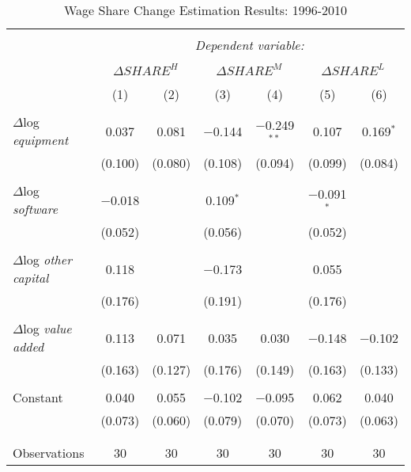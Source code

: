 \documentclass{article}
\begin{document}
\begin{sidewaystable}[!htbp] \centering 
  \caption{Wage Share Change Estimation Results: 1996-2010} 
  \label{tbl:reg} 
\begin{tabular}{@{\extracolsep{5pt}}lcccccc} 
\\[-1.8ex]\hline 
\hline \\[-1.8ex] 
 & \multicolumn{6}{c}{\textit{Dependent variable:}} \\ 
\cline{2-7} 
\\[-1.8ex] & \multicolumn{2}{c}{$\Delta SHARE^H$} & \multicolumn{2}{c}{$\Delta SHARE^M$} & \multicolumn{2}{c}{$\Delta SHARE^L$} \\ 
\\[-1.8ex] & (1) & (2) & (3) & (4) & (5) & (6)\\ 
\hline \\[-1.8ex] 
 $\Delta$log {\em equipment} & 0.037 & 0.081 & $-$0.144 & $-$0.249$^{**}$ & 0.107 & 0.169$^{*}$ \\ 
  & (0.100) & (0.080) & (0.108) & (0.094) & (0.099) & (0.084) \\ 
  & & & & & & \\ 
 $\Delta$log {\em software} & $-$0.018 &  & 0.109$^{*}$ &  & $-$0.091$^{*}$ &  \\ 
  & (0.052) &  & (0.056) &  & (0.052) &  \\ 
  & & & & & & \\ 
 $\Delta$log {\em other capital} & 0.118 &  & $-$0.173 &  & 0.055 &  \\ 
  & (0.176) &  & (0.191) &  & (0.176) &  \\ 
  & & & & & & \\ 
 $\Delta$log {\em value added} & 0.113 & 0.071 & 0.035 & 0.030 & $-$0.148 & $-$0.102 \\ 
  & (0.163) & (0.127) & (0.176) & (0.149) & (0.163) & (0.133) \\ 
  & & & & & & \\ 
 Constant & 0.040 & 0.055 & $-$0.102 & $-$0.095 & 0.062 & 0.040 \\ 
  & (0.073) & (0.060) & (0.079) & (0.070) & (0.073) & (0.063) \\ 
  & & & & & & \\ 
\hline \\[-1.8ex] 
Observations & 30 & 30 & 30 & 30 & 30 & 30 \\ 

\end{tabular}
\end{sidewaystable}
\end{document}
